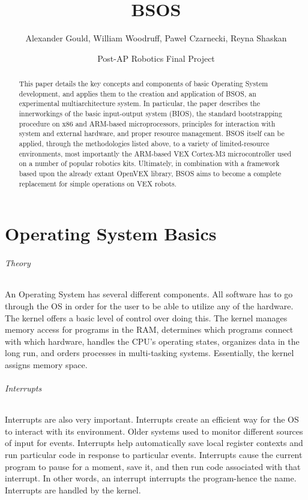 \documentclass[english]{paper}
\begin{document}
\title{BSOS}

\author{Alexander Gould, William Woodruff, Pawe\l{} Czarnecki, Reyna Shaskan}

\date{Post-AP Robotics Final Project}
\maketitle
\begin{abstract}
This paper details the key concepts and components of basic Operating System development, and applies them to the creation and application of BSOS, an experimental multiarchitecture system. In particular, the paper describes the innerworkings of the basic input-output system (BIOS), the standard bootstrapping procedure on x86 and ARM-based microprocessors, principles for interaction with system and external hardware, and proper resource management. BSOS itself can be applied, through the methodologies listed above, to a variety of limited-resource environments, most importantly the ARM-based VEX Cortex-M3 microcontroller used on a number of popular robotics kits. Ultimately, in combination with a framework based upon the already extant OpenVEX library, BSOS aims to become a complete replacement for simple operations on VEX robots.
\end{abstract}

\part{Operating System Basics}
\paragraph{Theory}
An Operating System has several different components. All software has to go through the OS in order for the user to be able to utilize any of the hardware. The kernel offers a basic level of control over doing this. The kernel manages memory access for programs in the RAM, determines which programs connect with which hardware, handles the CPU's operating states, organizes data in the long run, and orders processes in multi-tasking systems. Essentially, the kernel assigns memory space.

\paragraph{Interrupts}
Interrupts are also very important. Interrupts create an efficient way for the OS to interact with its environment. Older systems used to monitor different sources of input for events. Interrupts help automatically save local register contexts and run particular code in response to particular events. Interrupts cause the current program to pause for a moment, save it, and then run code associated with that interrupt. In other words, an interrupt interrupts the program-hence the name. Interrupts are handled by the kernel.
\end{document}
